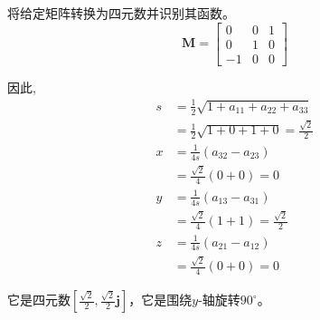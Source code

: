 \begin{example}
    将给定矩阵转换为四元数并识别其函数。
    $$
    \mathbf{M}=\left[\begin{array}{ccc}
    0 & 0 & 1 \\
    0 & 1 & 0 \\
    -1 & 0 & 0
    \end{array}\right]
    $$
    
    因此,
    $$
    \begin{aligned}
        \displaystyle
    s & =\frac{1}{2} \sqrt{1+a_{11}+a_{22}+a_{33}} \\
    & =\frac{1}{2} \sqrt{1+0+1+0}=\frac{\sqrt{2}}{2}\\
    x & =\frac{1}{4 s}\left(a_{32}-a_{23}\right) \\
    & =\frac{\sqrt{2}}{4}(0+0)=0 \\
    y & =\frac{1}{4 s}\left(a_{13}-a_{31}\right) \\
    & =\frac{\sqrt{2}}{4}(1+1)=\frac{\sqrt{2}}{2} \\
    z & =\frac{1}{4 s}\left(a_{21}-a_{12}\right) \\
    & =\frac{\sqrt{2}}{4}(0+0)=0
    \end{aligned}
    $$

    它是四元数$\displaystyle\left[\frac{\sqrt{2}}{2}, \frac{\sqrt{2}}{2} \mathbf{j}\right]$，它是围绕$y$-轴旋转$90^{\circ}$。
\end{example}
